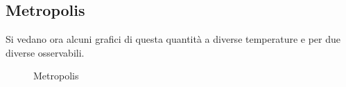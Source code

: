 \subsection*{Metropolis}
Si vedano ora alcuni grafici di questa quantità a diverse temperature e per due diverse osservabili.
\begin{figure}[h!]
\caption{Metropolis}
\end{figure}
